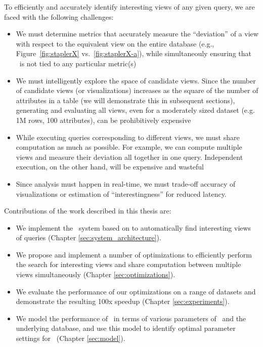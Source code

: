 To efficiently and accurately identify interesting views of any given query, we
are faced with the following challenges:
\begin{itemize}
  \item We must determine metrics that accurately measure the ``deviation'' of a
view with respect to the equivalent view on the entire database (e.g.,
Figure~\ref{fig:staplerX} vs.~\ref{fig:staplerX-a}), while simultaneouly
ensuring that \SeeDB\ is not tied to any particular metric(s)
\item We must
intelligently explore the space of candidate views. Since the number of
candidate views (or visualizations) increases as the square of the number of
attributes in a table (we will demonstrate this in subsequent sections),
generating and evaluating all views, even for a moderately sized dataset (e.g.
1M rows, 100 attributes), can be prohibitively expensive
\item While executing
queries corresponding to different views, we must share computation as much as
possible. For example, we can compute multiple views and measure their deviation
all together in one query. Independent execution, on the other hand, will be
expensive and wasteful
\item Since analysis must happen in real-time, we must trade-off accuracy of
visualizations or estimation of ``interestingness'' for reduced latency.
\end{itemize}

Contributions of the work described in this thesis are:
\begin{itemize}
  \item We implement the \SeeDB\ system based on \cite{DBLP:conf/vldb/Parameswaran2013} to
  automatically find interesting views of queries (Chapter
  \ref{sec:system_architecture}).
  \item We propose and implement a number of optimizations to
  efficiently perform the search for interesting views and share
  computation between multiple views simultaneously (Chapter
  \ref{sec:optimizations}).
  \item We evaluate the performance of our optimizations on a range of datasets
  and demonstrate the resulting 100x speedup (Chapter
  \ref{sec:experiments}).
  \item We model the performance of \SeeDB\ in terms of various parameters of
  \SeeDB\ and the underlying database, and use this model to identify optimal
  parameter settings for \SeeDB\ (Chapter \ref{sec:model}).
\end{itemize}



